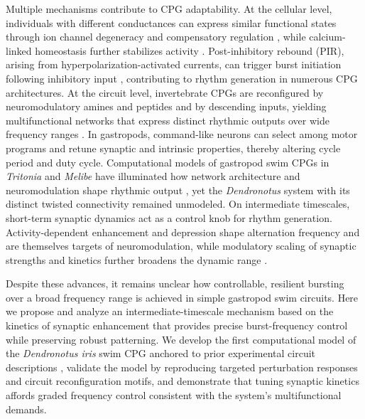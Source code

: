 \documentclass[nofootinbib,aip,amsmath,amssymb,preprint,twocolumn,floatfix,10pt]{revtex4-2}
\begin{document}
Multiple mechanisms contribute to CPG adaptability. At the cellular level, individuals with different conductances can express similar functional states through ion channel degeneracy and compensatory regulation \cite{Marder2011, OLeary2014}, while calcium-linked homeostasis further stabilizes activity \cite{Franci2020}. Post-inhibitory rebound (PIR), arising from hyperpolarization-activated currents, can trigger burst initiation following inhibitory input \cite{Perkel-Mulloney-74}, contributing to rhythm generation in numerous CPG architectures. At the circuit level, invertebrate CPGs are reconfigured by neuromodulatory amines and peptides and by descending inputs, yielding multifunctional networks that express distinct rhythmic outputs over wide frequency ranges \cite{MarderBucher2001, NusbaumBeenhakker2002, JingWeiss2005, BriggmanKristan2008}. In gastropods, command-like neurons can select among motor programs and retune synaptic and intrinsic properties, thereby altering cycle period and duty cycle. Computational models of gastropod swim CPGs in \textit{Tritonia} and \textit{Melibe} have illuminated how network architecture and neuromodulation shape rhythmic output \cite{NW02, TW05, SNLK11}, yet the \textit{Dendronotus} system with its distinct twisted connectivity remained unmodeled. On intermediate timescales, short-term synaptic dynamics act as a control knob for rhythm generation. Activity-dependent enhancement and depression shape alternation frequency and are themselves targets of neuromodulation, while modulatory scaling of synaptic strengths and kinetics further broadens the dynamic range \cite{zucker2002short, jackman2017mechanisms, Manor1997, NadimBucher2014, NeherBrose2018}.

Despite these advances, it remains unclear how controllable, resilient bursting over a broad frequency range is achieved in simple gastropod swim circuits. Here we propose and analyze an intermediate-timescale mechanism based on the kinetics of synaptic enhancement that provides precise burst-frequency control while preserving robust patterning. We develop the first computational model of the \textit{Dendronotus iris} swim CPG anchored to prior experimental circuit descriptions \cite{SakuraiKatz2016, sakurai2019command}, validate the model by reproducing targeted perturbation responses and circuit reconfiguration motifs, and demonstrate that tuning synaptic kinetics affords graded frequency control consistent with the system's multifunctional demands.
\end{document}
